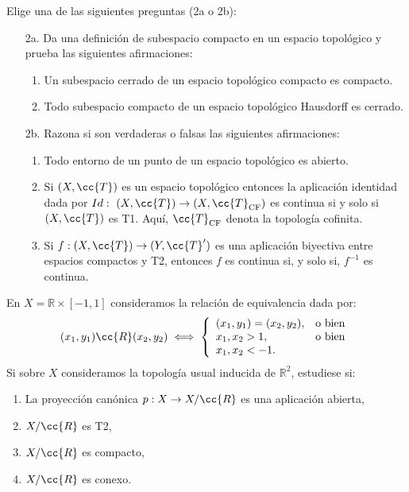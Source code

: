 \documentclass[12pt]{article}
\newcommand{\T}[0]{\cc{T}}
\begin{document}
    \begin{ejercicio}[2.5 puntos]
        Elige una de las siguientes preguntas (2a o 2b):
        \begin{enumerate}
          \item[2a.] Da una definición de subespacio compacto en un espacio topológico y prueba las siguientes afirmaciones:
          \begin{enumerate}
            \item Un subespacio cerrado de un espacio topológico compacto es compacto.
            \item Todo subespacio compacto de un espacio topológico Hausdorff es cerrado.
          \end{enumerate}

          \item[2b.] Razona si son verdaderas o falsas las siguientes afirmaciones:
          \begin{enumerate}
            \item Todo entorno de un punto de un espacio topológico es abierto.
            \item Si $(X, \T)$ es un espacio topológico entonces la aplicación identidad dada por $Id:~(X, \T) \to (X, \T_{\text{CF}})$ es continua si y solo si $(X,\T)$ es T1. Aquí, $\T_{\text{CF}}$ denota la topología cofinita.
            \item Si $f : (X, \T) \to (Y, \T')$ es una aplicación biyectiva entre espacios compactos y T2, entonces $f$ es continua si, y solo si, $f^{-1}$ es continua.
          \end{enumerate}
        \end{enumerate}
    \end{ejercicio}
        
    \begin{ejercicio}[2.5 puntos]
        En $X = \mathbb{R} \times [-1,1]$ consideramos la relación de equivalencia dada por:
        \[(x_1,y_1)\cc{R}(x_2,y_2) \iff \left\{
            \begin{array}{ll}
            (x_1, y_1) = (x_2, y_2), & \text{o bien} \\
            x_1, x_2 > 1, & \text{o bien} \\
            x_1, x_2 < -1.
            \end{array}
        \right.\]
        Si sobre $X$ consideramos la topología usual inducida de $\mathbb{R}^2$, estudiese si:
        \begin{enumerate}
            \item La proyección canónica $p : X \to X/\cc{R}$ es una aplicación abierta,
            \item $X/\cc{R}$ es T2,
            \item $X/\cc{R}$ es compacto,
            \item $X/\cc{R}$ es conexo.
        \end{enumerate}
    \end{ejercicio}
\end{document}
